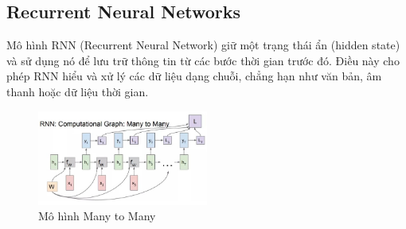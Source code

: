 \subsection{Recurrent Neural Networks} 
Mô hình RNN (Recurrent Neural Network) giữ một trạng thái ẩn (hidden state) và sử dụng nó để lưu trữ thông tin từ các bước thời gian trước đó. Điều này cho phép RNN hiểu và xử lý các dữ liệu dạng chuỗi, chẳng hạn như văn bản, âm thanh hoặc dữ liệu thời gian.
\begin{figure}[h]
    \centering
    \includegraphics[width=0.5\textwidth]{bibliography/pictures/RNN.jpg}
    \caption{Mô hình Many to Many}
\end{figure}

